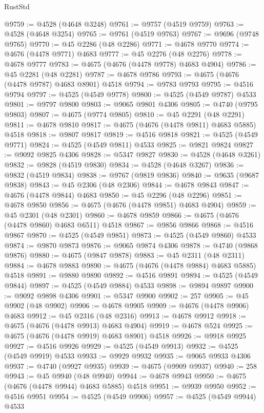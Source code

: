 \begin{lexlean}{RustStd}
\begin{coremodule}
{\begin{coremodule}
{{{{{{{{{{{{{{{{{{{{{{{{{{{{{{{{{{{{{{{{{{{{{{{{{{{{{{{{{{{{@9759 := @4528 (@4648 @3248)
@9761 := @9757 (@4519 @9759)
@9763 := @4528 (@4648 @3254)
@9765 := @9761 (@4519 @9763)
@9767 := @9696 (@9748 @9765)
@9770 := @45 @2286 (@48 @2286)
@9771 := @4678 @9770
@9774 := @4676 (@4478 @9771) @4683
@9777 := @45 @2276 (@48 @2276)
@9778 := @4678 @9777
@9783 := @4675 (@4676 (@4478 @9778) @4683 @4904)
@9786 := @45 @2281 (@48 @2281)
@9787 := @4678 @9786
@9793 := @4675 (@4676 (@4478 @9787) @4683 @8901) @4518
@9794 := @9783 @9793
@9795 := @4516 @9794
@9797 := @4525 (@4549 @9778)
@9800 := @4525 (@4549 @9787) @4533
@9801 := @9797 @9800
@9803 := @9065 @9801 @4306
@9805 := @4740 (@9795 @9803)
@9807 := @4675 (@9774 @9805)
@9810 := @45 @2291 (@48 @2291)
@9811 := @4678 @9810
@9817 := @4675 (@4676 (@4478 @9811) @4683 @5885) @4518
@9818 := @9807 @9817
@9819 := @4516 @9818
@9821 := @4525 (@4549 @9771)
@9824 := @4525 (@4549 @9811) @4533
@9825 := @9821 @9824
@9827 := @9092 @9825 @4306
@9828 := @5347 @9827
@9830 := @4528 (@4648 @3261)
@9832 := @9828 (@4519 @9830)
@9834 := @4528 (@4648 @3267)
@9836 := @9832 (@4519 @9834)
@9838 := @9767 (@9819 @9836)
@9840 := @9635 (@9687 @9838)
@9843 := @45 @2306 (@48 @2306)
@9844 := @4678 @9843
@9847 := @4676 (@4478 @9844) @4683
@9850 := @45 @2296 (@48 @2296)
@9851 := @4678 @9850
@9856 := @4675 (@4676 (@4478 @9851) @4683 @4904)
@9859 := @45 @2301 (@48 @2301)
@9860 := @4678 @9859
@9866 := @4675 (@4676 (@4478 @9860) @4683 @6511) @4518
@9867 := @9856 @9866
@9868 := @4516 @9867
@9870 := @4525 (@4549 @9851)
@9873 := @4525 (@4549 @9860) @4533
@9874 := @9870 @9873
@9876 := @9065 @9874 @4306
@9878 := @4740 (@9868 @9876)
@9880 := @4675 (@9847 @9878)
@9883 := @45 @2311 (@48 @2311)
@9884 := @4678 @9883
@9890 := @4675 (@4676 (@4478 @9884) @4683 @5885) @4518
@9891 := @9880 @9890
@9892 := @4516 @9891
@9894 := @4525 (@4549 @9844)
@9897 := @4525 (@4549 @9884) @4533
@9898 := @9894 @9897
@9900 := @9092 @9898 @4306
@9901 := @5347 @9900
@9902 := 257
@9905 := @45 @9902 (@48 @9902)
@9906 := @4678 @9905
@9909 := @4676 (@4478 @9906) @4683
@9912 := @45 @2316 (@48 @2316)
@9913 := @4678 @9912
@9918 := @4675 (@4676 (@4478 @9913) @4683 @4904)
@9919 := @4678 @524
@9925 := @4675 (@4676 (@4478 @9919) @4683 @8901) @4518
@9926 := @9918 @9925
@9927 := @4516 @9926
@9929 := @4525 (@4549 @9913)
@9932 := @4525 (@4549 @9919) @4533
@9933 := @9929 @9932
@9935 := @9065 @9933 @4306
@9937 := @4740 (@9927 @9935)
@9939 := @4675 (@9909 @9937)
@9940 := 258
@9943 := @45 @9940 (@48 @9940)
@9944 := @4678 @9943
@9950 := @4675 (@4676 (@4478 @9944) @4683 @5885) @4518
@9951 := @9939 @9950
@9952 := @4516 @9951
@9954 := @4525 (@4549 @9906)
@9957 := @4525 (@4549 @9944) @4533
}}}}}}}}}}}}}}}}}}}}}}}}}}}}}}}}}}}}}}}}}}}}}}}}}}}}}}}}}}}}
\end{coremodule}}
\end{coremodule}
\end{lexlean}
